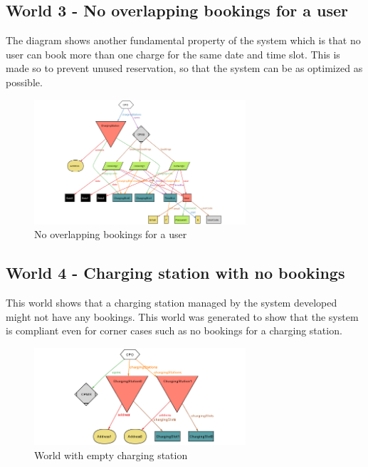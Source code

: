 \documentclass[12pt]{report}
\begin{document}
\subsection{World 3 - No overlapping bookings for a user}
The diagram shows another fundamental property of the system which is that no user can book more than one charge for the same date and time slot. This is made so to prevent unused reservation, so that the system can be as optimized as possible.
\begin{figure}[h]
    \centering
    \includegraphics[width = 0.7\textwidth]{assets/alloy_3.png}
    \caption{No overlapping bookings for a user}
\end{figure}

\subsection{World 4 - Charging station with no bookings}
This world shows that a charging station managed by the system developed might not have any bookings. This world was generated to show that the system is compliant even for corner cases such as no bookings for a charging station.
\begin{figure}[h]
    \centering
    \includegraphics[width = 0.7\textwidth]{assets/alloy_4.png}
    \caption{World with empty charging station}
\end{figure}
\newpage
\end{document}
